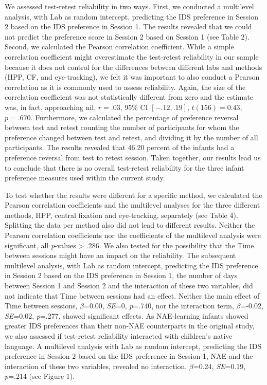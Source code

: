 \documentclass[
  man,floatsintext]{apa6}
\begin{document}
We assessed test-retest reliability in two ways. First, we conducted a multilevel analysis, with Lab as random intercept, predicting the IDS preference in Session 2 based on the IDS preference in Session 1. The results revealed that we could not predict the preference score in Session 2 based on Session 1 (see Table 2). Second, we calculated the Pearson correlation coefficient. While a simple correlation coefficient might overestimate the test-retest reliability in our sample because it does not control for the differences between different labs and methods (HPP, CF, and eye-tracking), we felt it was important to also conduct a Pearson correlation as it is commonly used to assess reliability. Again, the size of the correlation coefficient was not statistically different from zero and the estimate was, in fact, approaching nil, \(r = .03\), 95\% CI \([-.12, .19]\), \(t(156) = 0.43\), \(p = .670\). Furthermore, we calculated the percentage of preference reversal between test and retest counting the number of participants for whom the preference changed between test and retest, and dividing it by the number of all participants. The results revealed that 46.20 percent of the infants had a preference reversal from test to retest session. Taken together, our results lead us to conclude that there is no overall test-retest reliability for the three infant preference measures used within the current study.

To test whether the results were different for a specific method, we calculated the Pearson correlation coefficients and the multilevel analyses for the three different methods, HPP, central fixation and eye-tracking, separately (see Table 4). Splitting the data per method also did not lead to different results. Neither the Pearson correlation coefficients nor the coefficients of the multilevel analysis were significant, all \emph{p}-values \textgreater{} .286.
We also tested for the possibility that the Time between sessions might have an impact on the reliability. The subsequent multilevel analysis, with Lab as random intercept, predicting the IDS preference in Session 2 based on the IDS preference in Session 1, the number of days between Session 1 and Session 2 and the interaction of these two variables, did not indicate that Time between sessions had an effect. Neither the main effect of Time between sessions, \(\beta\)=0.00, \emph{SE}=0, \emph{p}=.740, nor the interaction term, \(\beta\)=-0.02, \emph{SE}=0.02, \emph{p}=.277, showed significant effects.
As NAE-learning infants showed greater IDS preferences than their non-NAE counterparts in the original study, we also assessed if test-retest reliability interacted with children's native language. A multilevel analysis with Lab as random intercept, predicting the IDS preference in Session 2 based on the IDS preference in Session 1, NAE and the interaction of these two variables, revealed no interaction, \(\beta\)=0.24, \emph{SE}=0.19, \emph{p}=.214 (see Figure 1).
\end{document}
